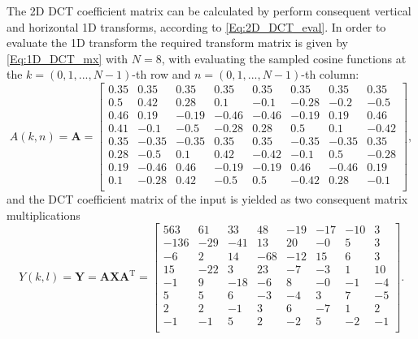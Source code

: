 The 2D DCT coefficient matrix can be calculated by perform consequent vertical and horizontal 1D transforms, according to \eqref{Eq:2D_DCT_eval}.
In order to evaluate the 1D transform the required transform matrix is given by \eqref{Eq:1D_DCT_mx} with $N = 8$, with evaluating the sampled cosine functions at the $k = (0,1,...,N-1)$-th row and  $n = (0,1,...,N-1)$-th column:
\begin{equation}
A(k,n) = \mathbf{A} = \begin{bmatrix}
       0.35  &  0.35  &  0.35  &  0.35  &  0.35  &  0.35  &  0.35 & 0.35  \\[0.3em]
	0.5     & 0.42  & 0.28   &  0.1   & -0.1   & -0.28  & -0.2  &  -0.5 \\[0.3em]
    0.46 &  0.19  & -0.19 & -0.46 &  -0.46 & -0.19  &  0.19  &  0.46 \\[0.3em]
    0.41  & -0.1   & -0.5  & -0.28 &   0.28 &  0.5  &   0.1  & -0.42 \\[0.3em]
    0.35  & -0.35  & -0.35 &   0.35 &   0.35  & -0.35 &  -0.35  &  0.35 \\[0.3em]
    0.28  & -0.5 &  0.1 &   0.42 &  -0.42 & -0.1 &   0.5 & -0.28 \\[0.3em]
    0.19  & -0.46  &  0.46  & -0.19 &  -0.19  &  0.46  & -0.46  &  0.19 \\[0.3em]
    0.1 &  -0.28 &    0.42 &  -0.5 & 0.5 & -0.42 & 0.28 & -0.1 \\[0.3em]
       \end{bmatrix}, 
\end{equation}
and the DCT coefficient matrix of the input is yielded as two consequent matrix multiplications
\begin{equation}
Y(k,l) =  \mathbf{Y} = \mathbf{A} \mathbf{X} \mathbf{A}^{\mathrm{T}} =
\begin{bmatrix}
  563  & 61 &  33 &  48 & -19 & -17&  -10 &   3 \\[0.3em]
 -136 & -29 & -41 &  13&  20 & -0 &  5    &   3 \\[0.3em]
   -6 &   2 &  14 & -68 & -12 & 15 &   6  &   3 \\[0.3em]
   15 & -22 &  3  &  23 &  -7 &  -3 &   1 &   10 \\[0.3em]
   -1 &   9& -18  &  -6 &   8 &  -0 &  -1 &  -4 \\[0.3em]
    5 &   5&   6  &  -3 &  -4 &   3 &   7 &  -5 \\[0.3em]
    2 &   2&  -1   &   3 &   6 &  -7 &  1 &   2 \\[0.3em]
   -1&  -1&   5   &   2 &  -2 &   5 &  -2 &  -1 \\[0.3em]
       \end{bmatrix}.
\label{eq:DCT_Example}
\end{equation}
